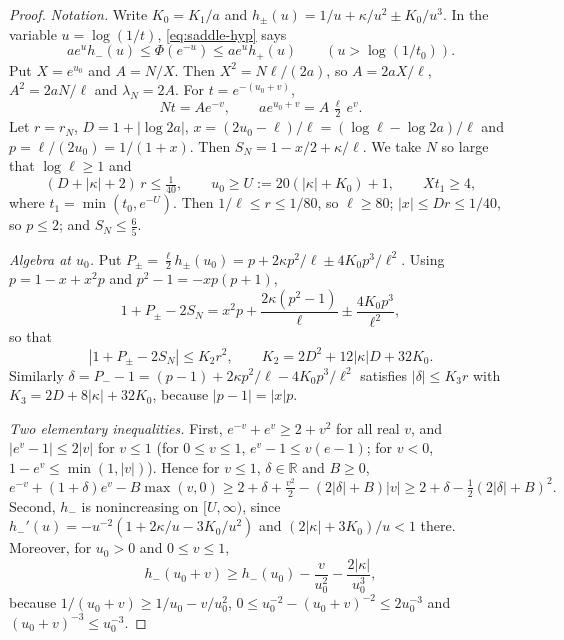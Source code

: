 \documentclass[11pt]{article}
\theoremstyle{remark}
\begin{document}
\begin{proof}
\emph{Notation.} Write $K_0=K_1/a$ and
$h_\pm(u)=1/u+\kappa/u^2\pm K_0/u^3$. In the variable $u=\log(1/t)$,
\eqref{eq:saddle-hyp} says
\begin{equation}\label{eq:saddle-hpm}
  a e^uh_-(u)\le\Phi(e^{-u})\le a e^uh_+(u)\qquad(u>\log(1/t_0)).
\end{equation}
Put $X=e^{u_0}$ and $A=N/X$. Then $X^2=N\ell/(2a)$, so $A=2aX/\ell$,
$A^2=2aN/\ell$ and $\lambda_N=2A$. For $t=e^{-(u_0+v)}$,
\begin{equation}\label{eq:saddle-scale}
  Nt=Ae^{-v},\qquad ae^{u_0+v}=A\,\tfrac{\ell}{2}\,e^{v}.
\end{equation}
Let $r=r_N$, $D=1+|\log2a|$, $x=(2u_0-\ell)/\ell=(\log\ell-\log2a)/\ell$
and $p=\ell/(2u_0)=1/(1+x)$. Then $S_N=1-x/2+\kappa/\ell$. We take $N$
so large that $\log\ell\ge1$ and
\begin{equation}\label{eq:saddle-large}
  (D+|\kappa|+2)\,r\le\tfrac1{40},\qquad
  u_0\ge U:=20(|\kappa|+K_0)+1,\qquad Xt_1\ge4,
\end{equation}
where $t_1=\min(t_0,e^{-U})$. Then $1/\ell\le r\le1/80$, so $\ell\ge80$;
$|x|\le Dr\le1/40$, so $p\le2$; and $S_N\le\frac65$.

\emph{Algebra at $u_0$.} Put $P_\pm=\frac\ell2h_\pm(u_0)
=p+2\kappa p^2/\ell\pm4K_0p^3/\ell^2$. Using $p=1-x+x^2p$ and
$p^2-1=-xp(p+1)$,
\[
  1+P_\pm-2S_N=x^2p+\frac{2\kappa(p^2-1)}{\ell}\pm\frac{4K_0p^3}{\ell^2},
\]
so that
\begin{equation}\label{eq:saddle-alg}
  |1+P_\pm-2S_N|\le K_2r^2,\qquad K_2=2D^2+12|\kappa|D+32K_0 .
\end{equation}
Similarly $\delta=P_--1=(p-1)+2\kappa p^2/\ell-4K_0p^3/\ell^2$
satisfies $|\delta|\le K_3r$ with $K_3=2D+8|\kappa|+32K_0$, because
$|p-1|=|x|p$.

\emph{Two elementary inequalities.} First, $e^{-v}+e^v\ge2+v^2$ for
all real $v$, and $|e^v-1|\le2|v|$ for $v\le1$ (for $0\le v\le1$,
$e^v-1\le v(e-1)$; for $v<0$, $1-e^v\le\min(1,|v|)$). Hence for $v\le1$,
$\delta\in\mathbb R$ and $B\ge0$,
\begin{equation}\label{eq:saddle-quad}
  e^{-v}+(1+\delta)e^v-B\max(v,0)
  \ge2+\delta+\tfrac{v^2}2-(2|\delta|+B)|v|
  \ge2+\delta-\tfrac12(2|\delta|+B)^2 .
\end{equation}
Second, $h_-$ is nonincreasing on $[U,\infty)$, since
$h_-'(u)=-u^{-2}(1+2\kappa/u-3K_0/u^2)$ and
$(2|\kappa|+3K_0)/u<1$ there. Moreover, for $u_0>0$ and $0\le v\le1$,
\begin{equation}\label{eq:saddle-step}
  h_-(u_0+v)\ge h_-(u_0)-\frac{v}{u_0^2}-\frac{2|\kappa|}{u_0^3},
\end{equation}
because $1/(u_0+v)\ge1/u_0-v/u_0^2$,
$0\le u_0^{-2}-(u_0+v)^{-2}\le2u_0^{-3}$ and
$(u_0+v)^{-3}\le u_0^{-3}$.


\end{proof}
\end{document}
